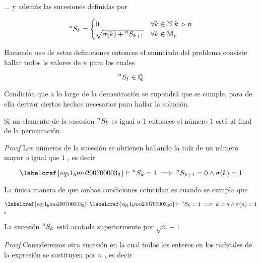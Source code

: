 ... y además las sucesiones definidas por

\begin{equation} \label{eq_11_bmo200700003_2}
	\prescript{n}{}{S_k} = 
	\begin{cases}
		0 & \forall k \in \mathbb{N}\ k > n \\
		\sqrt{\sigma(k) + \prescript{n}{}{S_{k+1}}} & \forall k \in \mathbb{M}\textsubscript{n}
	\end{cases}
\end{equation}

Haciendo uso de estas definiciones entonces el enunciado del problema consiste hallar todos ls valores de $n$ para los cuales 

\begin{equation} \label{eq_11_bmo200700003_3}
	\prescript{n}{}{S_1} \in \mathbb{Q}
\end{equation}

Condición que a lo largo de la demostración se supondrá que se cumple, para de ella derivar ciertos hechos necesarios para hallar la solución.

\begin{claim}
	Si un elemento de la sucesion $\prescript{n}{}{S_k}$ es igual a $1$ entonces el número $1$ está al final de la permutación.
\end{claim}

\textit{Proof} Los números de la sucesión se obtienen hallando la raíz de un número mayor o igual que $1$ , es decir

\begin{equation} \label{eq_11_bmo200700003_3a}
	\labelcref{eq_11_bmo200700003_2} \vdash \prescript{n}{}{S_k} = 1 \implies \prescript{n}{}{S_{k+1}} = 0 \land \sigma(k) = 1
\end{equation}

La única manera de que ambas condiciones coincidan es cuando se cumpla que

\begin{equation} \label{eq_11_bmo200700003_3b}
	\labelcref{eq_11_bmo200700003_2}, \labelcref{eq_11_bmo200700003_3a} \vdash \prescript{n}{}{S_k} = 1 \implies k=n \land \sigma(n) = 1
\end{equation}
\hfill $\square$

\begin{claim}
	La sucesión $\prescript{n}{}{S_k}$ está acotada superiormente por $\sqrt{n} + 1$
\end{claim}

\textit{Proof} Consideremos otra sucesión en la cual todos los enteros en los radicales de la expresión se sustituyen por $n$ , es decir

